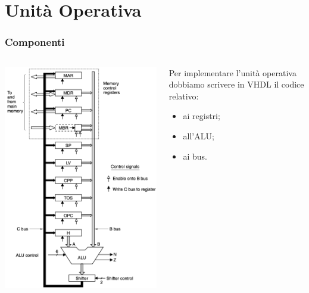 \documentclass{beamer}
\begin{document}
\section{Unità Operativa}
\begin{frame}[fragile]
  \frametitle{Componenti}
  \begin{columns}
    \begin{column}{0.4\textwidth}
      \begin{center}
        \includegraphics[width=\textwidth]{datapath.png}
      \end{center}
    \end{column}
    \begin{column}{0.6\textwidth}
      Per implementare l'unità operativa dobbiamo scrivere in VHDL il codice
      relativo:
      \begin{itemize}
        \item ai registri;
        \item all'ALU;
        \item ai bus.
      \end{itemize}
    \end{column}
  \end{columns}
\end{frame}
\end{document}
